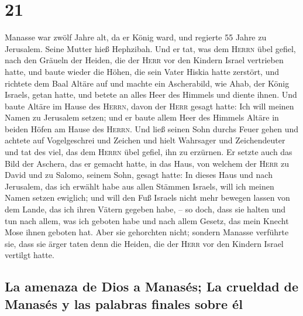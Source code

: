 \hypertarget{section-20}{%
\section{21}\label{section-20}}

 Manasse war zwölf Jahre alt, da er König ward, und
regierte 55 Jahre zu Jerusalem. Seine Mutter hieß Hephzibah.
 Und er tat, was dem \textsc{Herrn} übel gefiel, nach den
Gräueln der Heiden, die der \textsc{Herr} vor den Kindern Israel
vertrieben hatte,  und baute wieder die Höhen, die sein
Vater Hiskia hatte zerstört, und richtete dem Baal Altäre auf und machte
ein Ascherabild, wie Ahab, der König Israels, getan hatte, und betete an
alles Heer des Himmels und diente ihnen.  Und baute Altäre
im Hause des \textsc{Herrn}, davon der \textsc{Herr} gesagt hatte: Ich
will meinen Namen zu Jerusalem setzen;  und er baute allem
Heer des Himmels Altäre in beiden Höfen am Hause des \textsc{Herrn}.
 Und ließ seinen Sohn durchs Feuer gehen und achtete auf
Vogelgeschrei und Zeichen und hielt Wahrsager und Zeichendeuter und tat
des viel, das dem \textsc{Herrn} übel gefiel, ihn zu erzürnen.
 Er setzte auch das Bild der Aschera, das er gemacht
hatte, in das Haus, von welchem der \textsc{Herr} zu David und zu
Salomo, seinem Sohn, gesagt hatte: In dieses Haus und nach Jerusalem,
das ich erwählt habe aus allen Stämmen Israels, will ich meinen Namen
setzen ewiglich;  und will den Fuß Israels nicht mehr
bewegen lassen von dem Lande, das ich ihren Vätern gegeben habe, -- so
doch, dass sie halten und tun nach allem, was ich geboten habe und nach
allem Gesetz, das mein Knecht Mose ihnen geboten hat. 
Aber sie gehorchten nicht; sondern Manasse verführte sie, dass sie ärger
taten denn die Heiden, die der \textsc{Herr} vor den Kindern Israel
vertilgt hatte.

\hypertarget{la-amenaza-de-dios-a-manasuxe9s-la-crueldad-de-manasuxe9s-y-las-palabras-finales-sobre-uxe9l}{%
\subsection{La amenaza de Dios a Manasés; La crueldad de Manasés y las
palabras finales sobre
él}\label{la-amenaza-de-dios-a-manasuxe9s-la-crueldad-de-manasuxe9s-y-las-palabras-finales-sobre-uxe9l}}

